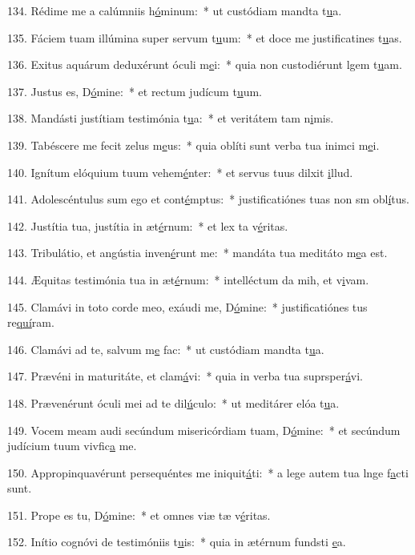 134. Rédime me a calúmniis h\uline{ó}minum:~* ut custódiam mandta t\uline{u}a.\par 
135. Fáciem tuam illúmina super servum t\uline{u}um:~* et doce me justificatines t\uline{u}as.\par 
136. Exitus aquárum deduxérunt óculi m\uline{e}i:~* quia non custodiérunt lgem t\uline{u}am.\par 
137. Justus es, D\uline{ó}mine:~* et rectum judícum t\uline{u}um.\par 
138. Mandásti justítiam testimónia t\uline{u}a:~* et veritátem tam n\uline{i}mis.\par 
139. Tabéscere me fecit zelus m\uline{e}us:~* quia oblíti sunt verba tua inimci m\uline{e}i.\par 
140. Ignítum elóquium tuum vehem\uline{é}nter:~* et servus tuus dilxit \uline{i}llud.\par 
141. Adolescéntulus sum ego et cont\uline{é}mptus:~* justificatiónes tuas non sm obl\uline{í}tus.\par 
142. Justítia tua, justítia in æt\uline{é}rnum:~* et lex ta v\uline{é}ritas.\par 
143. Tribulátio, et angústia inven\uline{é}runt me:~* mandáta tua meditáto m\uline{e}a est.\par 
144. Æquitas testimónia tua in æt\uline{é}rnum:~* intelléctum da mih, et v\uline{i}vam.\par 
145. Clamávi in toto corde meo, exáudi me, D\uline{ó}mine:~* justificatiónes tus re\uline{quí}ram.\par 
146. Clamávi ad te, salvum m\uline{e} fac:~* ut custódiam mandta t\uline{u}a.\par 
147. Prævéni in maturitáte, et clam\uline{á}vi:~* quia in verba tua suprsper\uline{á}vi.\par 
148. Prævenérunt óculi mei ad te dil\uline{ú}culo:~* ut meditárer elóa t\uline{u}a.\par 
149. Vocem meam audi secúndum misericórdiam tuam, D\uline{ó}mine:~* et secúndum judícium tuum vivfic\uline{a} me.\par 
150. Appropinquavérunt persequéntes me iniquit\uline{á}ti:~* a lege autem tua lnge f\uline{a}cti sunt.\par 
151. Prope es tu, D\uline{ó}mine:~* et omnes viæ tæ v\uline{é}ritas.\par 
152. Inítio cognóvi de testimóniis t\uline{u}is:~* quia in ætérnum fundsti \uline{e}a.\par 
